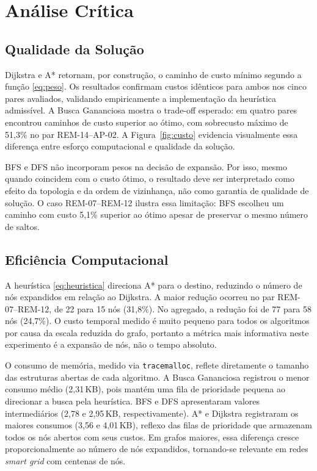 \documentclass[conference]{IEEEtran}
\begin{document}
\section{Análise Crítica}

\subsection{Qualidade da Solução}

Dijkstra e A* retornam, por construção, o caminho de custo mínimo segundo
a função \eqref{eq:peso}. Os resultados confirmam custos idênticos para
ambos nos cinco pares avaliados, validando empiricamente a implementação
da heurística admissível. A Busca Gananciosa mostra o trade-off esperado:
em quatro pares encontrou caminhos de custo superior ao ótimo, com
sobrecusto máximo de 51{,}3\% no par REM-14--AP-02. A
Figura~\ref{fig:custo} evidencia visualmente essa diferença entre esforço
computacional e qualidade da solução.

BFS e DFS não incorporam pesos na decisão de expansão. Por isso, mesmo
quando coincidem com o custo ótimo, o resultado deve ser interpretado como
efeito da topologia e da ordem de vizinhança, não como garantia de qualidade
de solução. O caso REM-07--REM-12 ilustra essa limitação: BFS escolheu um
caminho com custo 5{,}1\% superior ao ótimo apesar de preservar o mesmo
número de saltos.

\subsection{Eficiência Computacional}

A heurística \eqref{eq:heuristica} direciona A* para o destino, reduzindo
o número de nós expandidos em relação ao Dijkstra. A maior redução ocorreu
no par REM-07--REM-12, de 22 para 15 nós (31{,}8\%). No agregado, a redução foi
de 77 para 58 nós (24{,}7\%). O custo temporal medido é muito pequeno para
todos os algoritmos por causa da escala reduzida do grafo, portanto a métrica
mais informativa neste experimento é a expansão de nós, não o tempo absoluto.

O consumo de memória, medido via \texttt{tracemalloc}, reflete diretamente o 
tamanho das estruturas abertas de cada algoritmo. A Busca
Gananciosa registrou o menor consumo médio (2,31\,KB), pois mantém uma fila
de prioridade pequena ao direcionar a busca pela heurística. BFS e DFS
apresentaram valores intermediários (2,78 e 2,95\,KB, respectivamente).
A* e Dijkstra registraram os maiores consumos (3,56 e 4,01\,KB), reflexo
das filas de prioridade que armazenam todos os nós abertos com seus custos.
Em grafos maiores, essa diferença cresce proporcionalmente ao número de nós
expandidos, tornando-se relevante em redes \textit{smart grid} com centenas de nós.
\end{document}
